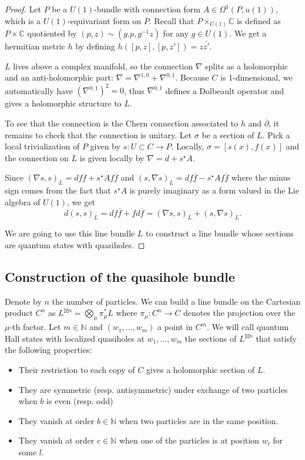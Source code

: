 \documentclass{article}
\theoremstyle{definition}
\newcommand{\ov}[1]{\overline{#1}}
\begin{document}
\begin{proof}
Let $P$ be a $U(1)$-bundle with connection form $A \in \Omega^1(P,u(1))$, which is a $U(1)$-equivariant form on $P$. Recall that $P \times_{U(1)} \mathbb{C}$ is defined as $P\times \mathbb{C}$ quotiented by $(p,z)\sim(g.p,g^{-1} z)$ for any $g \in U(1)$. We get a hermitian metric $h$ by defining $h([p,z],[p,z'])= z \ov{z'}$.

$L$ lives above a complex manifold, so the connection $\nabla$ splits as a holomorphic and an anti-holomorphic part: $\nabla=\nabla^{1,0}+\nabla^{0,1}$. Because $C$ is 1-dimensional, we automatically have $({\nabla^{0,1}})^2=0$, thus $\nabla^{0,1}$ defines a Dolbeault operator and gives a holomorphic structure to $L$.


To see that the connection is the Chern connection associated to $h$ and $\ov{\partial}$, it remains to check that the connection is unitary. Let $\sigma$ be a section of $L$. Pick a local trivialization of $P$ given by $s:U \subset C \to P$. Locally, $\sigma=[s(x),f(x)]$ and the connection on $L$ is given locally by $\nabla=d+s^\star A$.

Since $(\nabla s,s)_L=df \ov{f} + s^\star A f \ov{f}$ and $(s,\nabla s)_L=df \ov{f} - s^\star A f \ov{f}$ where the minus sign comes from the fact that $s^\star A$ is purely imaginary  as a form valued in the Lie algebra of $U(1)$, we get $$d(s,s)_L=df \ov{f} +  f d\ov{f}=(\nabla s, s)_L+(s,\nabla s)_L.$$

We are going to use this line bundle $L$ to construct a line bundle whose sections  are quantum states with quasiholes.


\end{proof}






\subsection{Construction of the quasihole bundle}

 
Denote by $n$ the number of particles. We can build a line bundle on the Cartesian product $C^{n}$ as $L^{\boxtimes n}=\bigotimes_\mu \pi_\mu^*L$ where $\pi_\mu:C^n\rightarrow C$ denotes the projection over the $\mu$-th factor. Let $m\in \mathbb{N}$ and $(w_1,\dots,w_m)$ a point in $C^m$.
We will call quantum Hall states with localized quasiholes at $w_1,\dots,w_m$ the sections of $L^{\boxtimes n}$ that satisfy the following properties:

\begin{itemize}
    \item Their restriction to each copy of $C$ gives a holomorphic section of $L$.
    \item They are symmetric (resp. antisymmetric) under exchange of two particles when $b$ is even (resp. odd)
    \item They vanish at order $b \in \mathbb{N}$ when two particles are in the same position.
    \item  They vanish at order $c \in \mathbb{N}$ when one of the particles is at position $w_l$ for some $l$.
\end{itemize}
\end{document}
